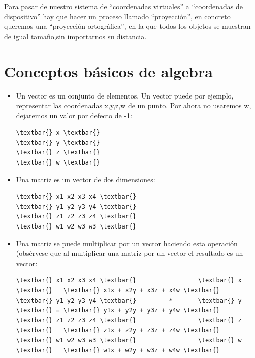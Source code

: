 \documentclass[a4paper,12pt,spanish]{sphinxmanual}
\begin{document}
Para pasar de nuestro sistema de ``coordenadas virtuales'' a ``coordenadas de dispositivo'' hay que hacer un proceso llamado ``proyección'', en concreto queremos una ``proyección ortográfica'', en la que todos los objetos se muestran de igual tamaño,sin importarnos su distancia.


\section{Conceptos básicos de algebra}
\label{cap5opengl:conceptos-basicos-de-algebra}\begin{itemize}
\item {} 
Un vector es un conjunto de elementos. Un vector puede por ejemplo, representar las coordenadas x,y,z,w de un punto. Por ahora no usaremos w, dejaremos un valor por defecto de -1:

\begin{Verbatim}[commandchars=\\\{\}]
\textbar{} x \textbar{}
\textbar{} y \textbar{}
\textbar{} z \textbar{}
\textbar{} w \textbar{}
\end{Verbatim}

\item {} 
Una matriz es un vector de dos dimensiones:

\begin{Verbatim}[commandchars=\\\{\}]
\textbar{} x1 x2 x3 x4 \textbar{}
\textbar{} y1 y2 y3 y4 \textbar{}
\textbar{} z1 z2 z3 z4 \textbar{}
\textbar{} w1 w2 w3 w3 \textbar{}
\end{Verbatim}

\item {} 
Una matriz se puede multiplicar por un vector haciendo esta operación (obsérvese que al multiplicar una matriz por un vector el resultado es un vector:

\begin{Verbatim}[commandchars=\\\{\}]
\textbar{} x1 x2 x3 x4 \textbar{}                 \textbar{} x \textbar{}   \textbar{} x1x + x2y + x3z + x4w \textbar{}
\textbar{} y1 y2 y3 y4 \textbar{}         *       \textbar{} y \textbar{} = \textbar{} y1x + y2y + y3z + y4w \textbar{}
\textbar{} z1 z2 z3 z4 \textbar{}                 \textbar{} z \textbar{}   \textbar{} z1x + z2y + z3z + z4w \textbar{}
\textbar{} w1 w2 w3 w3 \textbar{}                 \textbar{} w \textbar{}   \textbar{} w1x + w2y + w3z + w4w \textbar{}
\end{Verbatim}


\end{itemize}
\end{document}
